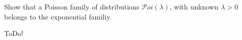 
\begin{exercise}

Show that a Poisson family of distributions $\mathcal Poi(\lambda)$, with unknown $\lambda > 0$ belongs to the exponential familiy.

\end{exercise}


\begin{solution}

ToDo!

\end{solution}

